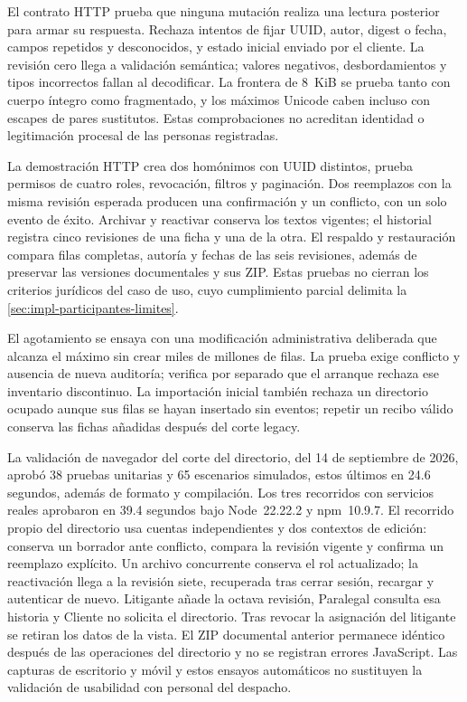 El contrato HTTP prueba que ninguna mutación realiza una lectura posterior para armar su respuesta. Rechaza intentos de fijar UUID, autor, digest o fecha, campos repetidos y desconocidos, y estado inicial enviado por el cliente. La revisión cero llega a validación semántica; valores negativos, desbordamientos y tipos incorrectos fallan al decodificar. La frontera de 8~KiB se prueba tanto con cuerpo íntegro como fragmentado, y los máximos Unicode caben incluso con escapes de pares sustitutos. Estas comprobaciones no acreditan identidad o legitimación procesal de las personas registradas.

La demostración HTTP crea dos homónimos con UUID distintos, prueba permisos de cuatro roles, revocación, filtros y paginación. Dos reemplazos con la misma revisión esperada producen una confirmación y un conflicto, con un solo evento de éxito. Archivar y reactivar conserva los textos vigentes; el historial registra cinco revisiones de una ficha y una de la otra. El respaldo y restauración compara filas completas, autoría y fechas de las seis revisiones, además de preservar las versiones documentales y sus ZIP. Estas pruebas no cierran los criterios jurídicos del caso de uso, cuyo cumplimiento parcial delimita la \cref{sec:impl-participantes-limites}.

El agotamiento se ensaya con una modificación administrativa deliberada que alcanza el máximo sin crear miles de millones de filas. La prueba exige conflicto y ausencia de nueva auditoría; verifica por separado que el arranque rechaza ese inventario discontinuo. La importación inicial también rechaza un directorio ocupado aunque sus filas se hayan insertado sin eventos; repetir un recibo válido conserva las fichas añadidas después del corte legacy.

La validación de navegador del corte del directorio, del 14 de septiembre de 2026, aprobó 38 pruebas unitarias y 65 escenarios simulados, estos últimos en 24.6 segundos, además de formato y compilación. Los tres recorridos con servicios reales aprobaron en 39.4 segundos bajo Node~22.22.2 y npm~10.9.7. El recorrido propio del directorio usa cuentas independientes y dos contextos de edición: conserva un borrador ante conflicto, compara la revisión vigente y confirma un reemplazo explícito. Un archivo concurrente conserva el rol actualizado; la reactivación llega a la revisión siete, recuperada tras cerrar sesión, recargar y autenticar de nuevo. Litigante añade la octava revisión, Paralegal consulta esa historia y Cliente no solicita el directorio. Tras revocar la asignación del litigante se retiran los datos de la vista. El ZIP documental anterior permanece idéntico después de las operaciones del directorio y no se registran errores JavaScript. Las capturas de escritorio y móvil y estos ensayos automáticos no sustituyen la validación de usabilidad con personal del despacho.

